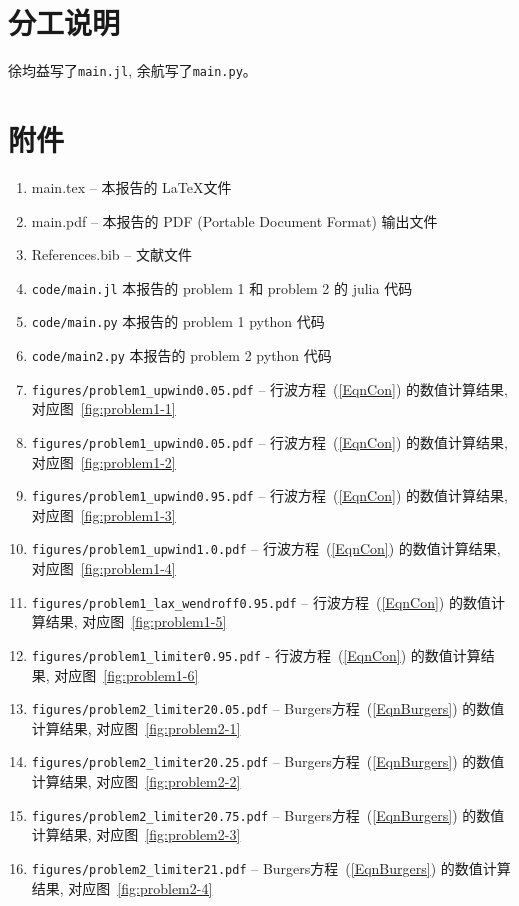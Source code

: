 \documentclass[10.5pt
]{article}
\begin{document}
\section{分工说明}

徐均益写了\verb|main.jl|, 
余航写了\verb|main.py|。

\section{附件}

\begin{enumerate}
\item
main.tex -- 本报告的 \LaTeX 文件
\item
main.pdf -- 本报告的 PDF (Portable Document Format) 输出文件
\item
References.bib -- 文献文件
\item
	\verb|code/main.jl| 本报告的 problem 1 和 problem 2 的 julia 代码
\item
	\verb|code/main.py| 本报告的 problem 1 python 代码
\item
	\verb|code/main2.py| 本报告的 problem 2 python 代码
\item
\verb|figures/problem1_upwind0.05.pdf| -- 行波方程~(\ref{EqnCon}) 的数值计算结果, 对应图~\ref{fig:problem1-1}
\item
\verb|figures/problem1_upwind0.05.pdf| -- 行波方程~(\ref{EqnCon}) 的数值计算结果, 对应图~\ref{fig:problem1-2}
\item
\verb|figures/problem1_upwind0.95.pdf| -- 行波方程~(\ref{EqnCon}) 的数值计算结果, 对应图~\ref{fig:problem1-3}
\item
\verb|figures/problem1_upwind1.0.pdf| -- 行波方程~(\ref{EqnCon}) 的数值计算结果, 对应图~\ref{fig:problem1-4}
\item
\verb|figures/problem1_lax_wendroff0.95.pdf| -- 行波方程~(\ref{EqnCon}) 的数值计算结果, 对应图~\ref{fig:problem1-5}
\item
\verb|figures/problem1_limiter0.95.pdf| - 行波方程~(\ref{EqnCon}) 的数值计算结果, 对应图~\ref{fig:problem1-6}
\item
\verb|figures/problem2_limiter20.05.pdf| -- Burgers方程~(\ref{EqnBurgers}) 的数值计算结果, 对应图~\ref{fig:problem2-1}
\item
\verb|figures/problem2_limiter20.25.pdf| -- Burgers方程~(\ref{EqnBurgers}) 的数值计算结果, 对应图~\ref{fig:problem2-2}
\item
\verb|figures/problem2_limiter20.75.pdf| -- Burgers方程~(\ref{EqnBurgers}) 的数值计算结果, 对应图~\ref{fig:problem2-3}
\item
\verb|figures/problem2_limiter21.pdf| -- Burgers方程~(\ref{EqnBurgers}) 的数值计算结果, 对应图~\ref{fig:problem2-4}
\end{enumerate}
\end{document}
